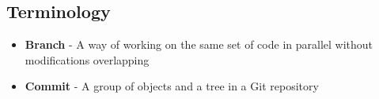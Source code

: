 \subsection{Terminology}
\begin{itemize}
\item\textbf{Branch} - A way of working on the same set of code in parallel without modifications overlapping

\item\textbf{Commit} - A group of objects and a tree in a Git repository
\end{itemize}
